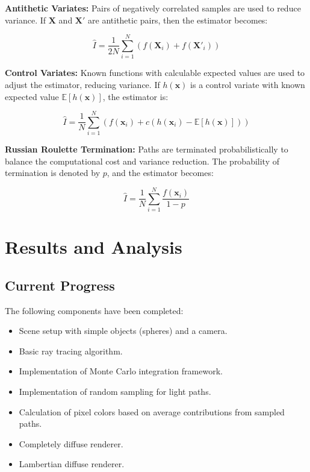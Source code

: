 \documentclass[12pt]{article}
\begin{document}
\textbf{Antithetic Variates:} Pairs of negatively correlated samples are used to reduce variance. If $\mathbf{X}$ and $\mathbf{X}'$ are antithetic pairs, then the estimator becomes:

\begin{equation}
    \hat{I} = \frac{1}{2N} \sum_{i=1}^{N} \left( f(\mathbf{X}_i) + f(\mathbf{X}'_i) \right)
\end{equation}

\textbf{Control Variates:} Known functions with calculable expected values are used to adjust the estimator, reducing variance. If $h(\mathbf{x})$ is a control variate with known expected value $\mathbb{E}[h(\mathbf{x})]$, the estimator is:

\begin{equation}
    \hat{I} = \frac{1}{N} \sum_{i=1}^{N} \left( f(\mathbf{x}_i) + c (h(\mathbf{x}_i) - \mathbb{E}[h(\mathbf{x})]) \right)
\end{equation}

\textbf{Russian Roulette Termination:} Paths are terminated probabilistically to balance the computational cost and variance reduction. The probability of termination is denoted by $p$, and the estimator becomes:

\begin{equation}
    \hat{I} = \frac{1}{N} \sum_{i=1}^{N} \frac{f(\mathbf{x}_i)}{1 - p}
\end{equation}

\section{Results and Analysis}
\label{sec:results-analysis}
\subsection{Current Progress}
The following components have been completed:
\begin{itemize}
    \item Scene setup with simple objects (spheres) and a camera.
    \item Basic ray tracing algorithm.
    \item Implementation of Monte Carlo integration framework.
    \item Implementation of random sampling for light paths.
    \item Calculation of pixel colors based on average contributions from sampled paths.
    \item Completely diffuse renderer.
    \item Lambertian diffuse renderer.
\end{itemize}
\end{document}
